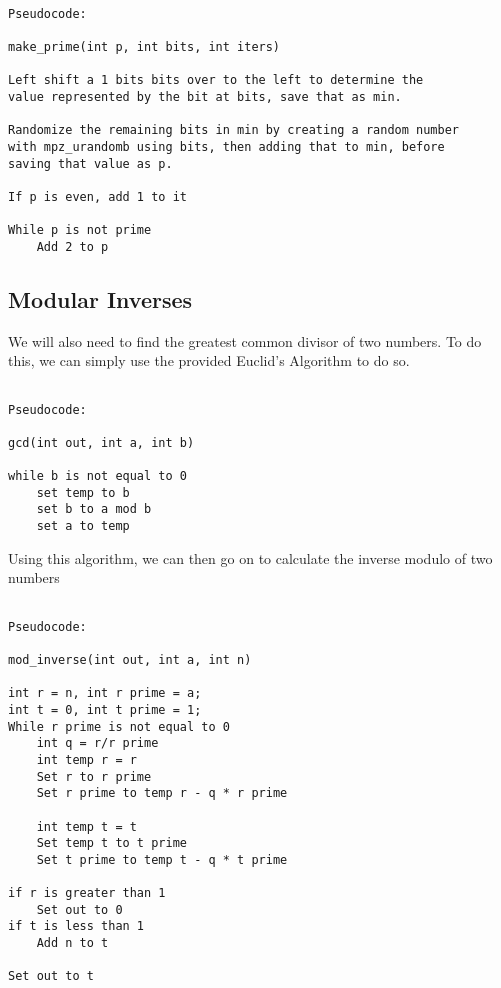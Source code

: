 \documentclass[11pt]{article}
\begin{document}
\begin{verbatim}

Pseudocode:

make_prime(int p, int bits, int iters)

Left shift a 1 bits bits over to the left to determine the
value represented by the bit at bits, save that as min.

Randomize the remaining bits in min by creating a random number
with mpz_urandomb using bits, then adding that to min, before
saving that value as p.

If p is even, add 1 to it

While p is not prime
    Add 2 to p

\end{verbatim}


\subsection{Modular Inverses}

We will also need to find the greatest common divisor of two numbers. To do this, we can simply use the provided Euclid's Algorithm to do so.

\begin{verbatim}

Pseudocode:

gcd(int out, int a, int b)

while b is not equal to 0
    set temp to b
    set b to a mod b
    set a to temp

\end{verbatim}

Using this algorithm, we can then go on to calculate the inverse modulo of two numbers

\begin{verbatim}

Pseudocode:

mod_inverse(int out, int a, int n)

int r = n, int r prime = a;
int t = 0, int t prime = 1;
While r prime is not equal to 0
    int q = r/r prime
    int temp r = r
    Set r to r prime
    Set r prime to temp r - q * r prime

    int temp t = t
    Set temp t to t prime
    Set t prime to temp t - q * t prime

if r is greater than 1
    Set out to 0
if t is less than 1
    Add n to t

Set out to t

\end{verbatim}
\end{document}
